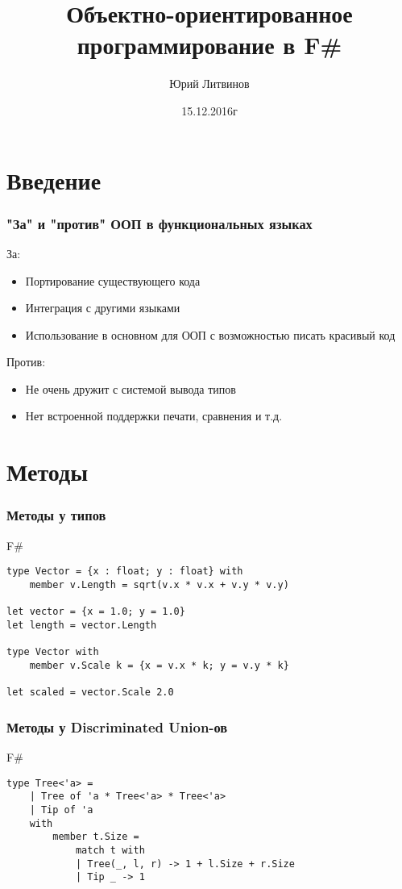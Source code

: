 \documentclass[xetex,mathserif,serif]{beamer}
\title{Объектно-ориентированное программирование в F\#}
\author{Юрий Литвинов}
\date{15.12.2016г}
\begin{document}
	
	\frame{\titlepage}
	
	\section{Введение}

	\begin{frame}
		\frametitle{"За" и "против" ООП в функциональных языках}
		За:
		\begin{itemize}
    		\item Портирование существующего кода
    		\item Интеграция с другими языками
    		\item Использование в основном для ООП с возможностью писать красивый код
		\end{itemize}
		
		Против:
		\begin{itemize}
    		\item Не очень дружит с системой вывода типов
    		\item Нет встроенной поддержки печати, сравнения и т.д.
		\end{itemize}
	\end{frame}
	
	\section{Методы}
	
	\begin{frame}[fragile]
		\frametitle{Методы у типов}
		\begin{exampleblock}{F\#}
			\begin{lstlisting}
type Vector = {x : float; y : float} with
    member v.Length = sqrt(v.x * v.x + v.y * v.y)
    
let vector = {x = 1.0; y = 1.0}
let length = vector.Length

type Vector with
    member v.Scale k = {x = v.x * k; y = v.y * k}

let scaled = vector.Scale 2.0
\end{lstlisting}
\end{exampleblock}
\end{frame}

	\begin{frame}[fragile]
		\frametitle{Методы у Discriminated Union-ов}
		\begin{exampleblock}{F\#}
			\begin{lstlisting}
type Tree<'a> =
    | Tree of 'a * Tree<'a> * Tree<'a>
    | Tip of 'a
    with
        member t.Size = 
            match t with
            | Tree(_, l, r) -> 1 + l.Size + r.Size
            | Tip _ -> 1
\end{lstlisting}
\end{exampleblock}
\end{frame}
\end{document}
